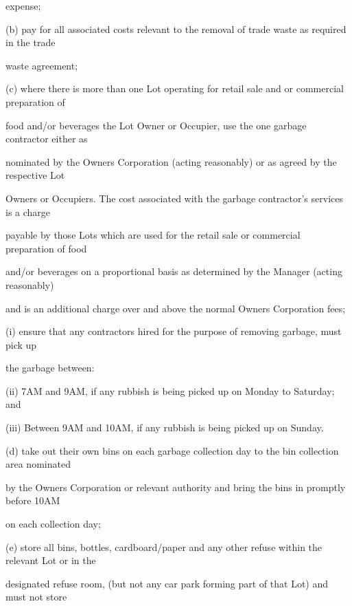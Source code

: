 \documentclass{article}
\begin{document}
{\fontsize{10.02}{1}expense; }

{\fontsize{9.962}{1}(b) pay for all associated costs relevant to the removal of trade waste as required in the trade }

{\fontsize{10.02}{1}waste agreement; }

{\fontsize{9.962}{1}(c) where there is more than one Lot operating for retail sale and or commercial preparation of }

\newpage

{\fontsize{10.02}{1}food and/or beverages the Lot Owner or Occupier, use the one garbage contractor either as }

{\fontsize{10.02}{1}nominated by the Owners Corporation (acting reasonably) or as agreed by the respective Lot }

{\fontsize{10.02}{1}Owners or Occupiers. The cost associated with the garbage contractor’s services is a charge }

{\fontsize{10.02}{1}payable by those Lots which are used for the retail sale or commercial preparation of food }

{\fontsize{10.02}{1}and/or beverages on a proportional basis as determined by the Manager (acting reasonably) }

{\fontsize{10.02}{1}and is an additional charge over and above the normal Owners Corporation fees; }

{\fontsize{9.962}{1}(i) ensure that any contractors hired for the purpose of removing garbage, must pick up }

{\fontsize{10.02}{1}the garbage between: }

{\fontsize{9.962}{1}(ii) 7AM and 9AM, if any rubbish is being picked up on Monday to Saturday; and }

{\fontsize{9.962}{1}(iii) Between 9AM and 10AM, if any rubbish is being picked up on Sunday. }

{\fontsize{9.962}{1}(d) take out their own bins on each garbage collection day to the bin collection area nominated }

{\fontsize{10.02}{1}by the Owners Corporation or relevant authority and bring the bins in promptly before 10AM }

{\fontsize{10.02}{1}on each collection day; }

{\fontsize{9.962}{1}(e) store all bins, bottles, cardboard/paper and any other refuse within the relevant Lot or in the }

{\fontsize{10.02}{1}designated refuse room, (but not any car park forming part of that Lot) and must not store }
\end{document}
